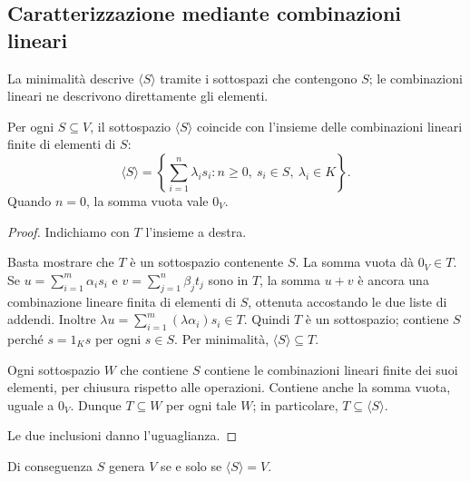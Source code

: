 \subsection{Caratterizzazione mediante combinazioni lineari}

La minimalità descrive $\langle S\rangle$ tramite i sottospazi che contengono $S$; le combinazioni lineari ne descrivono direttamente gli elementi.

\begin{teorema}
Per ogni $S\subseteq V$, il sottospazio $\langle S\rangle$ coincide con l'insieme delle combinazioni lineari finite di elementi di $S$:
\[
  \langle S\rangle=
  \left\{\sum_{i=1}^{n}\lambda_i s_i:
    n\geq0,\ s_i\in S,\ \lambda_i\in K\right\}.
\]
Quando $n=0$, la somma vuota vale $0_V$.
\end{teorema}
\begin{proof}
Indichiamo con $T$ l'insieme a destra.

 Basta mostrare che $T$ è un sottospazio contenente $S$. La somma vuota dà $0_V\in T$. Se $u=\sum_{i=1}^{m}\alpha_i s_i$ e $v=\sum_{j=1}^{n}\beta_j t_j$ sono in $T$, la somma $u+v$ è ancora una combinazione lineare finita di elementi di $S$, ottenuta accostando le due liste di addendi. Inoltre $\lambda u=\sum_{i=1}^{m}(\lambda\alpha_i)s_i\in T$. Quindi $T$ è un sottospazio; contiene $S$ perché $s=1_Ks$ per ogni $s\in S$. Per minimalità, $\langle S\rangle\subseteq T$.

 Ogni sottospazio $W$ che contiene $S$ contiene le combinazioni lineari finite dei suoi elementi, per chiusura rispetto alle operazioni. Contiene anche la somma vuota, uguale a $0_V$. Dunque $T\subseteq W$ per ogni tale $W$; in particolare, $T\subseteq\langle S\rangle$.

Le due inclusioni danno l'uguaglianza.
\end{proof}

Di conseguenza $S$ genera $V$ se e solo se $\langle S\rangle=V$.
